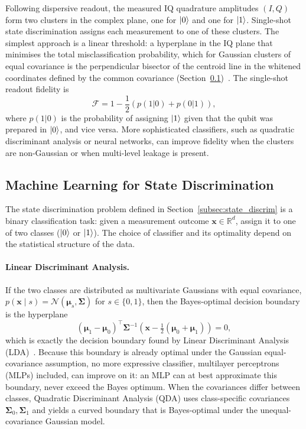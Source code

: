 Following dispersive readout, the measured IQ quadrature amplitudes $(I, Q)$ form
two clusters in the complex plane, one for $\ket{0}$ and one for $\ket{1}$.
Single-shot state discrimination assigns each measurement to one of these
clusters.  The simplest approach is a linear threshold: a hyperplane in the IQ
plane that minimises the total misclassification probability, which for Gaussian
clusters of equal covariance is the perpendicular bisector of the centroid line in
the whitened coordinates defined by the common covariance
(Section~\ref{subsec:ml_background})~\cite{Gambetta2007}.  The single-shot readout fidelity is
\begin{equation}
  \mathcal{F} = 1 - \frac{1}{2}\left(p(1|0) + p(0|1)\right),
\label{eq:fidelity}
\end{equation}
where $p(1|0)$ is the probability of assigning $\ket{1}$ given that the qubit was
prepared in $\ket{0}$, and vice versa.  More sophisticated classifiers, such as
quadratic discriminant analysis or neural networks, can improve fidelity when the
clusters are non-Gaussian or when multi-level leakage is present.

\subsection{Machine Learning for State Discrimination}
\label{subsec:ml_background}

The state discrimination problem defined in Section~\ref{subsec:state_discrim} is
a binary classification task: given a measurement outcome $\mathbf{x} \in
\mathbb{R}^d$, assign it to one of two classes ($\ket{0}$ or $\ket{1}$).  The
choice of classifier and its optimality depend on the statistical structure of the
data.

\paragraph{Linear Discriminant Analysis.}
If the two classes are distributed as multivariate Gaussians with equal covariance,
$p(\mathbf{x} \mid s) = \mathcal{N}(\boldsymbol{\mu}_s, \boldsymbol{\Sigma})$ for
$s \in \{0, 1\}$, then the Bayes-optimal decision boundary is the hyperplane
\begin{equation}
  (\boldsymbol{\mu}_1 - \boldsymbol{\mu}_0)^\top \boldsymbol{\Sigma}^{-1}
  \left(\mathbf{x} - \tfrac{1}{2}(\boldsymbol{\mu}_0 + \boldsymbol{\mu}_1)\right)
  = 0,
\label{eq:lda_boundary}
\end{equation}
which is exactly the decision boundary found by Linear Discriminant Analysis
(LDA)~\cite{Hastie2009}.  Because this boundary is already optimal under the
Gaussian equal-covariance assumption, no more expressive classifier, multilayer
perceptrons (MLPs) included, can improve on it: an MLP can at best approximate
this boundary, never exceed the Bayes optimum.  When the covariances differ
between classes, Quadratic Discriminant Analysis (QDA) uses class-specific
covariances $\boldsymbol{\Sigma}_0, \boldsymbol{\Sigma}_1$ and yields a curved
boundary that is Bayes-optimal under the unequal-covariance Gaussian model.

